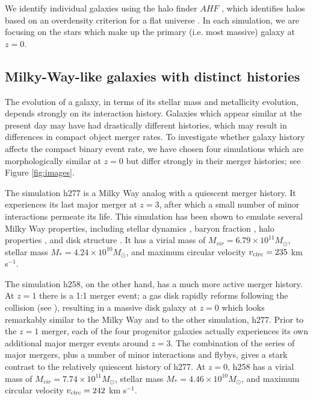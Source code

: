 \documentclass[nofootinbib,twocolumn,prd]{emulateapj}
\newcommand\editremark[1]{{\color{red}#1}}
\newcommand\msun{M_\odot}
\begin{document}

We identify individual galaxies using the halo finder $AHF$
\citep{Gill04,Knollmann09}, which identifies halos based on an
overdensity criterion for a flat universe \citep{Gross97}.  In each simulation, we are focusing on the stars which make up the primary (i.e. most massive) galaxy at $z = 0$.%



\subsection{Milky-Way-like galaxies with distinct histories }

The evolution
of a galaxy, in terms of its stellar mass and metallicity evolution,
depends strongly on its interaction history.  Galaxies which appear
similar at the present day may have had drastically different
histories, which may result in differences in compact object merger
rates.  To investigate whether galaxy history affects the compact binary event
rate, we have chosen four simulations which are morphologically similar at $z
= 0$ but differ strongly in their merger histories; see Figure \ref{fig:images}.

The simulation h277  is a Milky Way analog with a
quiescent merger history.  It experiences its last major merger at $z
= 3$, after which a small number of minor interactions permeate its
life.  This simulation has been shown to emulate several Milky Way
properties, including stellar dynamics
\citep{Loebman12,Loebman14,Kassin14}, baryon fraction
\citep{Munshi13}, halo properties \citep{Zolotov09,Zolotov10}, and
disk structure \citep{Brooks11}.  It has a virial mass of $M_{vir} =
6.79 \times 10^{11} \msun$, stellar mass $M_* = 4.24 \times 10^{10}
\msun$, and maximum circular velocity $v_{\rm circ} = 235$ km s$^{-1}$.

  The simulation h258, on the other hand, has a much
  more active merger history.  At $z = 1$ there is a 1:1 merger event;
  a gas disk rapidly reforms following the collision (see
  \citet{Governato09}), resulting in a massive disk galaxy at $z = 0$
  which looks remarkably similar to the Milky Way and to the other
  simulation, h277.  Prior to the $z = 1$ merger, each of the four
  progenitor galaxies actually experiences its own additional major
  merger events around $z = 3$.  The combination of
  the series of major mergers, plus a number of minor interactions and
  flybys, gives a stark contrast to the relatively quiescent history
  of h277.  At $z = 0$, h258 has a virial mass of $M_{vir} = 7.74
  \times 10^{11} \msun$, stellar mass $M_* = 4.46 \times 10^{10}
  \msun$, and maximum circular velocity $v_{\rm circ} = 242$ km s$^{-1}$.  %
\end{document}
